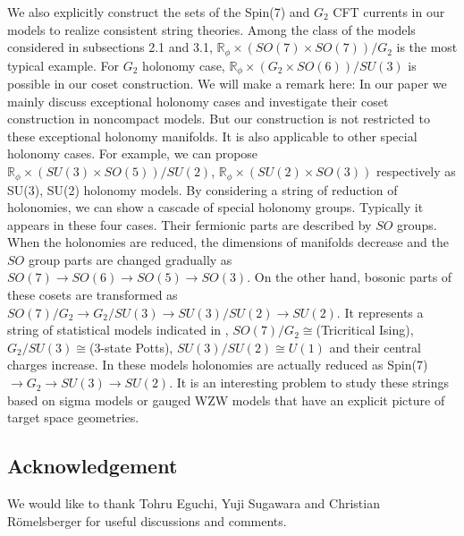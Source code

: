 \documentclass[a4paper,12pt]{article}
\numberwithin{equation}{section}
\newcommand{\Rb}{\mathbb{R}}
\newcommand{\Spin}[1]{{\rm Spin}(#1)}
\begin{document}
We also explicitly construct 
the sets of the \Spin 7 and $G_2$ CFT currents in our models 
to realize consistent string theories. 
Among the class of the models considered in subsections 2.1 and 3.1,
$\Rb_{\phi}\times (SO(7) \times SO(7)) /G_2 $ is the most typical example. 
For $G_2$ holonomy case, 
$\Rb_{\phi}\times   (G_2 \times SO(6)) /SU(3) $ 
is possible in our coset construction. 
We will make a remark here: In our paper we mainly discuss 
exceptional holonomy cases and investigate their coset 
construction in noncompact models. 
But our construction is not restricted 
to these exceptional holonomy manifolds. It is 
also applicable to other special holonomy cases. 
For example, we can propose 
$\Rb_{\phi}\times (SU(3) \times SO(5)) /SU(2) $,  
$\Rb_{\phi}\times (SU(2) \times SO(3)) $
respectively
as SU(3), SU(2) holonomy models.
By considering a string of reduction of 
holonomies, we can show a cascade of special holonomy groups. 
Typically it appears in these four cases. 
Their fermionic parts are described by $SO$ groups. 
When the holonomies are reduced, 
the dimensions of manifolds decrease and  
the $SO$ group parts are changed gradually as 
$SO(7)\rightarrow SO(6)\rightarrow SO(5)\rightarrow SO(3)$. 
On the other hand, bosonic parts of these cosets are transformed as 
$SO(7)/G_2\rightarrow G_2/SU(3)\rightarrow 
SU(3)/SU(2)\rightarrow SU(2)$. 
It represents a string of statistical models 
indicated in \cite{Sugiyama:2001qh}, 
$SO(7)/G_2\cong$(Tricritical Ising), 
$G_2/SU(3)\cong$(3-state Potts), $SU(3)/SU(2)\cong U(1)$ 
and their central charges increase. 
In these models holonomies are actually reduced as 
\Spin 7 $\rightarrow G_2\rightarrow SU(3)\rightarrow SU(2)$. 
It is an interesting problem to study these strings based on 
sigma models or 
gauged WZW models that have an explicit picture of target space 
geometries. 

\subsection*{Acknowledgement}
We would like to thank Tohru Eguchi, Yuji Sugawara and Christian 
R\"omelsberger for useful discussions and comments.
\end{document}
